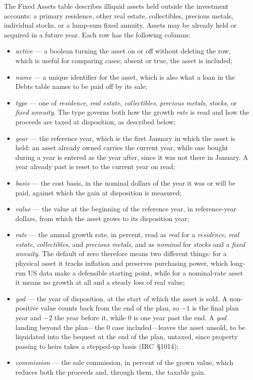 \documentclass[fleqn,12pt]{report}
\begin{document}
The Fixed Assets table describes illiquid assets held outside the investment
accounts: a primary residence, other real estate, collectibles, precious metals,
individual stocks, or a lump-sum fixed annuity.
Assets may be already held or acquired in a future year.
Each row has the following columns:
\begin{itemize}[nosep]
  \item \textit{active} --- a boolean turning the asset on or off without deleting
    the row, which is useful for comparing cases; absent or true, the asset is
    included;
  \item \textit{name} --- a unique identifier for the asset, which is also what a
    loan in the Debts table names to be paid off by its sale;
  \item \textit{type} --- one of \textit{residence}, \textit{real estate},
    \textit{collectibles}, \textit{precious metals}, \textit{stocks}, or
    \textit{fixed annuity}.  The type governs both how the growth \textit{rate}
    is read and how the proceeds are taxed at disposition, as described below;
  \item \textit{year} --- the reference year, which is the first January in which
    the asset is held: an asset already owned carries the current year, while one
    bought during a year is entered as the year after, since it was not there in
    January.  A year already past is reset to the current year on read;
  \item \textit{basis} --- the cost basis, in the nominal dollars of the year it
    was or will be paid, against which the gain at disposition is measured;
  \item \textit{value} --- the value at the beginning of the reference year, in
    reference-year dollars, from which the asset grows to its disposition year;
  \item \textit{rate} --- the annual growth rate, in percent, read as \emph{real}
    for a \textit{residence}, \textit{real estate}, \textit{collectibles}, and
    \textit{precious metals}, and as \emph{nominal} for \textit{stocks} and a
    \textit{fixed annuity}.  The default of zero therefore means two different
    things: for a physical asset it tracks inflation and preserves purchasing
    power, which long-run US data make a defensible starting point, while for a
    nominal-rate asset it means no growth at all and a steady loss of real value;
  \item \textit{yod} --- the year of disposition, at the start of which the asset
    is sold.  A non-positive value counts back from the end of the plan, so $-1$
    is the final plan year and $-2$ the year before it, while $0$ is one year
    past the end.  A \textit{yod} landing beyond the plan---the $0$ case
    included---leaves the asset unsold, to be liquidated into the bequest at the
    end of the plan, untaxed, since property passing to heirs takes a stepped-up
    basis (IRC~\S1014);
  \item \textit{commission} --- the sale commission, in percent of the grown
    value, which reduces both the proceeds and, through them, the taxable gain.
\end{itemize}
\end{document}

